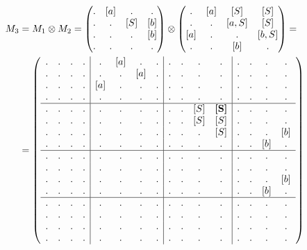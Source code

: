 \begin{example}
\begin{align}
M_3 &= M_1 \otimes M_2 = 
\begin{pmatrix} 
. & [a] & . & . \\
. & . & [S] & [b] \\
. & . & . & [b] \\
. & . & . & . 
\end{pmatrix}
\otimes 
\begin{pmatrix} 
. & [a] & [S] & [S] \\
. & . & [a,S] & [S] \\
[a] & . & . & [b,S] \\
. & . & [b] & . 
\end{pmatrix}
=\notag\\
&=
\left(\begin{array}{c c c c | c c c c | c c c c | c c c c } 
. & . & . & .  &  . & [a] & . & .  &  . & . & . & .    &  . & . & . & .   \\
. & . & . & .  &  . & . & [a] & .  &  . & . & . & .    &  . & . & . & .   \\
. & . & . & .  &  [a] & . & . & .  &  . & . & . & .    &  . & . & . & .   \\
. & . & . & .  &  . & . & . & .    &  . & . & . & .    &  . & . & . & .   \\
\hline
. & . & . & .  &  . & . & . & .    &  . & . & [S] & \textbf{[S]}    &  . & . & . & .   \\
. & . & . & .  &  . & . & . & .    &  . & . & [S] & [S]             &  . & . & . & .   \\
. & . & . & .  &  . & . & . & .    &  . & . & .   & [S]             &  . & . & . & [b] \\
. & . & . & .  &  . & . & . & .    &  . & . & .   & .               &  . & . & [b] & . \\
\hline
. & . & . & .  &  . & . & . & .    &  . & . & . & .    &  . & . & . & .   \\
. & . & . & .  &  . & . & . & .    &  . & . & . & .    &  . & . & . & .   \\
. & . & . & .  &  . & . & . & .    &  . & . & . & .    &  . & . & . & [b] \\
. & . & . & .  &  . & . & . & .    &  . & . & . & .    &  . & . & [b] & . \\
\hline
. & . & . & .  &  . & . & . & .    &  . & . & . & .    &  . & . & . & .   \\
. & . & . & .  &  . & . & . & .    &  . & . & . & .    &  . & . & . & .   \\
. & . & . & .  &  . & . & . & .    &  . & . & . & .    &  . & . & . & .   \\
. & . & . & .  &  . & . & . & .    &  . & . & . & .    &  . & . & . & . 
\end{array}\right)
\end{align}


\end{example}
